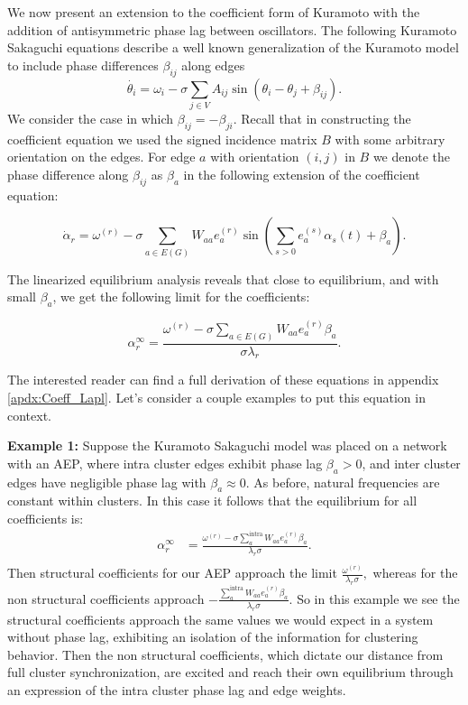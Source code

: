 \documentclass[%
 aip,
 amsmath,amssymb,
preprint,
reprint, onecolumn %
]{revtex4-1}
\begin{document}
We now present an extension to the coefficient form of Kuramoto with the addition of antisymmetric phase lag between oscillators. The following Kuramoto Sakaguchi equations describe a well known generalization of the Kuramoto model to include phase differences $\beta_{ij}$ along edges
\begin{equation}\label{sakaguchi}
    \dot{\theta_i} = \omega_i - \sigma \sum_{j\in V} A_{ij} \sin(\theta_i - \theta_j+ \beta_{ij}).
\end{equation}
We consider the case in which $\beta_{ij}=-\beta_{ji}$. Recall that in constructing the coefficient equation we used the signed incidence matrix $B$ with some arbitrary orientation on the edges. For edge $a$ with orientation $(i,j)$ in $B$ we denote the phase difference along $\beta_{ij}$ as $\beta_a$ in the following extension of the coefficient equation:

\begin{equation}\label{coeff_phase_lag}
    \dot{\alpha}_r = \omega^{(r)} - \sigma \sum_{a\in E(G)} W_{aa}   e_a^{(r)} \sin\left( \sum_{s>0} e_a^{(s)}\alpha_s(t) + \beta_{a}\right).
\end{equation}

The linearized equilibrium analysis reveals that close to equilibrium, and with small $\beta_a$, we get the following limit for the coefficients:

\[
\alpha_r^{\infty} =\frac{\omega^{(r)}-\sigma \sum_{a\in E(G)}W_{aa}e_a^{(r)}\beta_{a}}{\sigma \lambda_r}.
\]

The interested reader can find a full derivation of these equations in appendix \ref{apdx:Coeff_Lapl}. Let's consider a couple examples to put this equation in context.

\textbf{Example 1:} Suppose the Kuramoto Sakaguchi model was placed on a network with an AEP, where intra cluster edges exhibit phase lag $\beta_a>0$, and inter cluster edges have negligible phase lag with $\beta_a\approx 0$. As before, natural frequencies are constant within clusters. In this case it follows that the equilibrium for all coefficients is:
\begin{align*}
    \alpha_r^{\infty} &=\frac{\omega^{(r)}-\sigma\sum^{\text{intra}}_{a}W_{aa}e_a^{(r)}\beta_{a}}{\lambda_r \sigma}.\\
\end{align*}
Then structural coefficients for our AEP approach the limit $
\frac{\omega^{(r)}}{\lambda_r \sigma},
$
whereas for the non structural coefficients approach
$
-\frac{\sum^{\text{intra}}_{a}W_{aa}e_a^{(r)}\beta_{a}}{\lambda_r \sigma}.
$
So in this example we see the structural coefficients approach the same values we would expect in a system without phase lag, exhibiting an isolation of the information for clustering behavior. Then the non structural coefficients, which dictate our distance from full cluster synchronization, are excited and reach their own equilibrium through an expression of the intra cluster phase lag and edge weights.  
\end{document}
